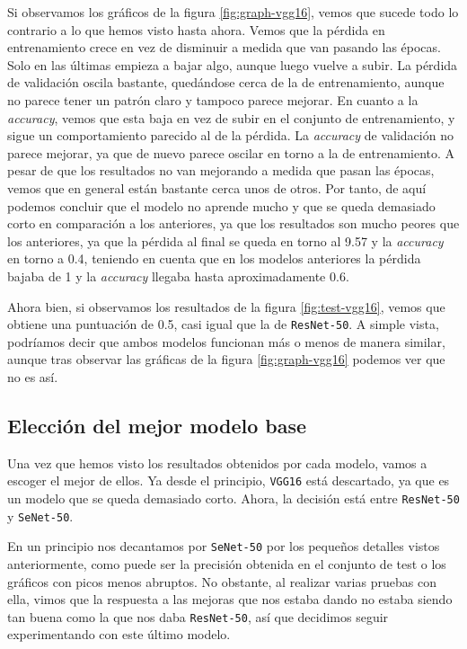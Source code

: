 \documentclass[11pt,a4paper]{article}
\begin{document}
Si observamos los gráficos de la figura \ref{fig:graph-vgg16}, vemos que sucede todo lo contrario
a lo que hemos visto hasta ahora. Vemos que la pérdida en entrenamiento crece en vez de disminuir a medida
que van pasando las épocas. Solo en las últimas empieza a bajar algo, aunque luego vuelve a subir. La pérdida
de validación oscila bastante, quedándose cerca de la de entrenamiento, aunque no parece tener un patrón claro y
tampoco parece mejorar. En cuanto a la \textit{accuracy}, vemos que esta baja en vez de subir en el conjunto de
entrenamiento, y sigue un comportamiento parecido al de la pérdida. La \textit{accuracy} de validación no parece
mejorar, ya que de nuevo parece oscilar en torno a la de entrenamiento. A pesar de que los resultados no van mejorando
a medida que pasan las épocas, vemos que en general están bastante cerca unos de otros. Por tanto, de aquí podemos
concluir que el modelo no aprende mucho y que se queda demasiado corto en comparación a los anteriores, ya que los
resultados son mucho peores que los anteriores, ya que la pérdida al final se queda en torno al 9.57 y la
\textit{accuracy} en torno a 0.4, teniendo en cuenta que en los modelos anteriores la pérdida bajaba
de 1 y la \textit{accuracy} llegaba hasta aproximadamente 0.6.

Ahora bien, si observamos los resultados de la figura \ref{fig:test-vgg16}, vemos que obtiene una puntuación de
0.5, casi igual que la de \texttt{ResNet-50}. A simple vista, podríamos decir que ambos modelos funcionan más
o menos de manera similar, aunque tras observar las gráficas de la figura \ref{fig:graph-vgg16} podemos ver
que no es así.

\subsection{Elección del mejor modelo base}

Una vez que hemos visto los resultados obtenidos por cada modelo, vamos a escoger el mejor de ellos. Ya desde
el principio, \texttt{VGG16} está descartado, ya que es un modelo que se queda demasiado corto. Ahora, la decisión
está entre \texttt{ResNet-50} y \texttt{SeNet-50}.

En un principio nos decantamos por \texttt{SeNet-50} por los pequeños detalles vistos anteriormente, como puede ser la
precisión obtenida en el conjunto de test o los gráficos con picos menos abruptos. No obstante, al realizar varias
pruebas con ella, vimos que la respuesta a las mejoras que nos estaba dando no estaba siendo tan buena como la que nos
daba \texttt{ResNet-50}, así que decidimos seguir experimentando con este último modelo.
\end{document}
